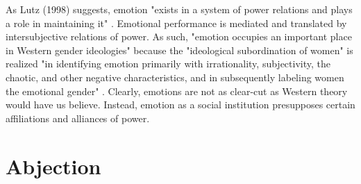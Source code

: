 \documentclass[letterpaper,12pt]{turabian-researchpaper}
\begin{document}
As Lutz (1998) suggests, emotion "exists in a system of power relations and plays a role in maintaining it" \autocite[54]{lutz_unnatural_1988}. Emotional performance is mediated and translated by intersubjective relations of power. As such, "emotion occupies an important place in Western gender ideologies" because the "ideological subordination of women" is realized "in identifying emotion primarily with irrationality, subjectivity, the chaotic, and other negative characteristics, and in subsequently labeling women the emotional gender" \autocite[54]{lutz_unnatural_1988}. Clearly, emotions are not as clear-cut as Western theory would have us believe. Instead, emotion as a social institution presupposes certain affiliations and alliances of power.

\section{Abjection}
\end{document}
